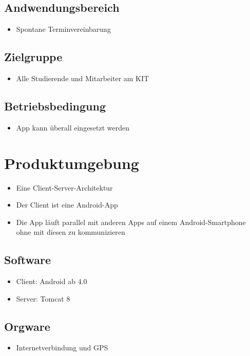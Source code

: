 \documentclass{scrartcl}
\begin{document}
	\subsection{Andwendungsbereich}
	\begin{itemize}	        
		\item Spontane Terminvereinbarung 
	\end{itemize}
	\subsection{Zielgruppe}
	\begin{itemize}	        
		\item Alle Studierende und Mitarbeiter am KIT
	\end{itemize}
	\subsection{Betriebsbedingung}
	\begin{itemize}	        
		\item App kann überall eingesetzt werden
	\end{itemize}
	
	\newpage
	
	
	\section{Produktumgebung}
	\begin{itemize}	        
		\item Eine Client-Server-Architektur
		\item Der Client ist eine Android-App
		\item Die App läuft parallel mit anderen Apps auf einem Android-Smartphone ohne mit diesen zu kommunizieren
	\end{itemize}
	\subsection{Software}
	\begin{itemize}	        
		\item Client: Android ab 4.0
		\item Server: Tomcat 8
	\end{itemize}	
	\subsection{Orgware}
	\begin{itemize}	        
		\item Internetverbindung und GPS
	\end{itemize}
\end{document}
